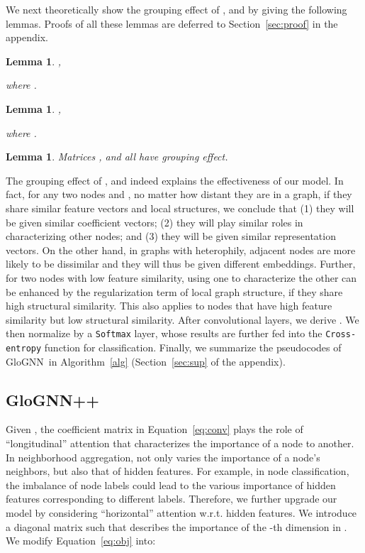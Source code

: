 \documentclass[nohyperref]{article}
\theoremstyle{plain}
\newtheorem{lemma}[theorem]{Lemma}
\theoremstyle{definition}
\theoremstyle{remark}
\newcommand{\ada}{GloGNN}
\begin{document}
We next theoretically show the grouping effect of ,  and 
by giving the following lemmas.
Proofs of all these lemmas
are deferred to Section~\ref{sec:proof} in the appendix.


\begin{lemma}
\label{lemma2}
,
\begin{scriptsize}

\end{scriptsize}
where {\small }.
\end{lemma}


\begin{lemma}
\label{lemma3}
,
\begin{scriptsize}

\end{scriptsize}
where {\small }.
\end{lemma}


\begin{lemma}
\label{lemma:z-star}
Matrices ,  and  all have grouping effect.
\end{lemma}



The grouping effect of ,  and 
indeed explains the effectiveness of our model.
In fact, 
for any two nodes  and ,
no matter how distant they are in a graph,
if they share similar feature vectors and local structures,
we conclude that
(1) they will be given similar coefficient vectors;
(2) they will play similar roles in characterizing other nodes;
and (3) they
will be given similar representation vectors.
On the other hand,
in graphs with heterophily,
adjacent nodes are more likely to be dissimilar
and they will thus be given different embeddings.
Further,
for two nodes with low feature similarity,
using one to characterize the other can be enhanced by the regularization term of local graph structure,
if they share high structural similarity.
This also applies to nodes that have high feature similarity but low structural similarity.
After  convolutional layers,
we derive .
We then normalize   by a \texttt{Softmax} layer,
whose results are further fed into the \texttt{Cross-entropy} function for classification.
Finally,
we summarize the pseudocodes of \ada\ in Algorithm~\ref{alg} (Section~\ref{sec:sup} of the appendix).


\subsection{\ada++}
Given ,
the coefficient matrix  in Equation~\ref{eq:conv} plays the role of ``longitudinal'' attention
that characterizes the importance of a node to another.
In neighborhood aggregation,
not only varies the importance of a node's neighbors, but also that of hidden features.
For example,
in node classification,
the imbalance of node labels could lead to the various importance of hidden features corresponding to different labels.
Therefore,
we further upgrade our model by considering ``horizontal'' attention w.r.t. hidden features.
We introduce a diagonal matrix  such that 
 describes the importance of the -th dimension in .
We modify Equation~\ref{eq:obj} into:
\end{document}
